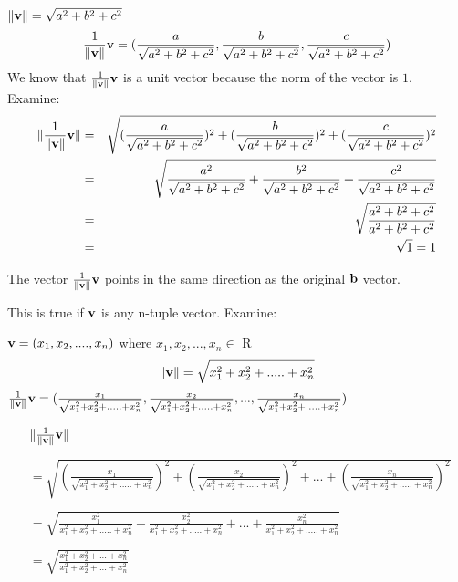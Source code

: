 \begin{enumerate}
\begin{description}
\noindent $\|{\bf v}\|=\sqrt{a^{2}+b^{2}+c^{2}}$
\begin{eqnarray*}
\frac{1}{\|{\bf v}\|}{\bf v}=
(\frac{a}{\sqrt{a^{2}+b^{2}+c^{2}}},\frac{b}{\sqrt{a^{2}+b^{2}+c^{2}}},
\frac{c}{\sqrt{a^{2}+b^{2}+c^{2}}})
\end{eqnarray*}
\noindent We know that $\frac{1}{\|{\bf v}\|}{\bf v}$ is a unit
vector because the norm of the vector is $1$. Examine:
\begin{eqnarray*} \|\frac{1}{\|{\bf v}\|}{\bf v}\|
&=&\sqrt{  (\frac{a}{\sqrt{a^{2}+b^{2}+c^{2}}})^{2} +
(\frac{b}{\sqrt{a^{2}+b^{2}+c^{2}}})^{2} +
(\frac{c}{\sqrt{a^{2}+b^{2}+c^{2}}})^{2} }
\\&=&\sqrt{ \frac{a^{2}}{\sqrt{a^{2}+b^{2}+c^{2}}}  +
\frac{b^{2}}{\sqrt{a^{2}+b^{2}+c^{2}}} +
\frac{c^{2}}{\sqrt{a^{2}+b^{2}+c^{2}}} }
\\&=&\sqrt{\frac{a^{2}+b^{2}+c^{2}}{a^{2}+b^{2}+c^{2}} }
\\&=&\sqrt{1}=1
\end{eqnarray*}

\noindent The vector $\frac{1}{\|{\bf v}\|}{\bf v}$ points in the
same direction as the original ${\bf b}$ vector.

\noindent This is true if ${\bf v}$ is any n-tuple vector.
Examine:

${\bf v}=(x_{1},x_{2},....,x_{n})$ where
$x_{1},x_{2},...,x_{n}\in$ {\tebbb R}
\begin{eqnarray*}
\|{\bf v} \|= \sqrt{x_{1}^{2}+x_{2}^{2}+.....+x_{n}^{2}}
\end{eqnarray*}
$\frac{1}{\|{\bf v} \|}{\bf
v}=(\frac{x_{1}}{\sqrt{x_{1}^{2}+x_{2}^{2}+.....+x_{n}^{2}}},\frac{x_{2}}{\sqrt{x_{1}^{2}
+x_{2}^{2}+.....+x_{n}^{2}}},...,\frac{x_{n}}{\sqrt{x_{1}^{2}+x_{2}^{2}+.....+x_{n}^{2}}})$

\begin{enumerate} \item[$\|\frac{1}{\|{\bf v} \|}{\bf v} \|$]

$=\sqrt{(\frac{x_{1}}{
\sqrt{x_{1}^{2}+x_{2}^{2}+.....+x_{n}^{2}}})^{2}+(\frac{x_{2}}{
\sqrt{x_{1}^{2}+x_{2}^{2}+.....+x_{n}^{2}}})^{2}+...+(\frac{x_{n}}{
\sqrt{x_{1}^{2}+x_{2}^{2}+.....+x_{n}^{2}}})^{2}}$

$=\sqrt{\frac{x_{1}^{2}}{x_{1}^{2}+x_{2}^{2}+.....+x_{n}^{2}}
+\frac{x_{2}^{2}}{x_{1}^{2}+x_{2}^{2}+.....+x_{n}^{2}}+...+\frac{x_{n}^{2}}{x_{1}^{2}+x_{2}^{2}
+.....+x_{n}^{2}}}$

$=\sqrt{\frac{ x_{1}^{2}+x_{2}^{2}+...+x_{n}^{2} }
{x_{1}^{2}+x_{2}^{2}+...+x_{n}^{2} }  }$


\end{enumerate}
\end{description}
\end{enumerate}
